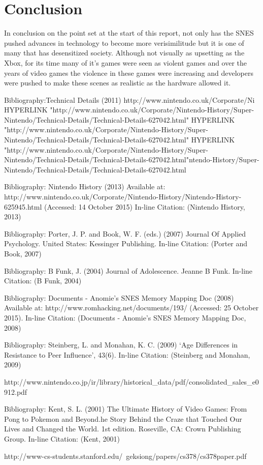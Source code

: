 \documentclass{scrartcl}
\begin{document}
\section{Conclusion}

In conclusion on the point set at the start of this report, not only has the SNES pushed advances in technology to become more verisimilitude but it is one of many that has desensitized society. Although not visually as upsetting as the Xbox, for its time many of it's games were seen as violent games and over the years of video games the violence in these games were increasing and developers were pushed to make these scenes as realistic as the hardware allowed it. 


\begin{thebibliography}{}
  Bibliography:Technical Details (2011)
http://www.nintendo.co.uk/Corporate/Ni HYPERLINK "http://www.nintendo.co.uk/Corporate/Nintendo-History/Super-Nintendo/Technical-Details/Technical-Details-627042.html" HYPERLINK "http://www.nintendo.co.uk/Corporate/Nintendo-History/Super-Nintendo/Technical-Details/Technical-Details-627042.html" HYPERLINK "http://www.nintendo.co.uk/Corporate/Nintendo-History/Super-Nintendo/Technical-Details/Technical-Details-627042.html"ntendo-History/Super-Nintendo/Technical-Details/Technical-Details-627042.html

Bibliography: Nintendo History (2013) Available at: http://www.nintendo.co.uk/Corporate/Nintendo-History/Nintendo-History-625945.html (Accessed: 14 October 2015) In-line Citation: (Nintendo History, 2013)

Bibliography: Porter, J. P. and Book, W. F. (eds.) (2007) Journal Of Applied Psychology. United States: Kessinger Publishing. In-line Citation: (Porter and Book, 2007)

Bibliography: B Funk, J. (2004) Journal of Adolescence. Jeanne B Funk. In-line Citation: (B Funk, 2004)

Bibliography: Documents - Anomie’s SNES Memory Mapping Doc (2008) Available at: http://www.romhacking.net/documents/193/ (Accessed: 25 October 2015). In-line Citation: (Documents - Anomie’s SNES Memory Mapping Doc, 2008)

Bibliography: Steinberg, L. and Monahan, K. C. (2009) ‘Age Differences in Resistance to Peer Influence’, 43(6). In-line Citation: (Steinberg and Monahan, 2009)

 http://www.nintendo.co.jp/ir/library/historical_data/pdf/consolidated_sales_e0912.pdf

Bibliography: Kent, S. L. (2001) The Ultimate History of Video Games: From Pong to Pokemon and Beyond.he Story Behind the Craze that Touched Our Lives and Changed the World. 1st edition. Roseville, CA: Crown Publishing Group. In-line Citation: (Kent, 2001)

http://www-cs-students.stanford.edu/~geksiong/papers/cs378/cs378paper.pdf
\end{thebibliography}
\end{document}
